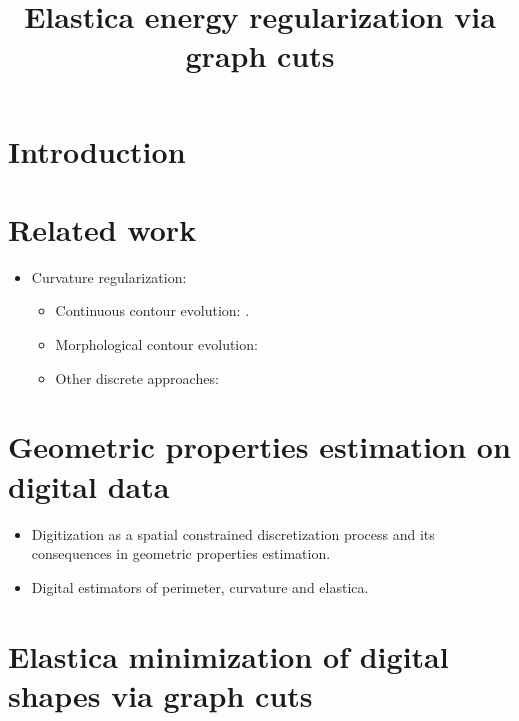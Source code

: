 \documentclass[12pt]{article}
\begin{document}
%
\title{Elastica energy regularization via graph cuts}

\maketitle

\begin{abstract}

\end{abstract}

\section{Introduction}

\section{Related work}
\begin{itemize}
\item{Curvature regularization:
\begin{itemize}
\item{Continuous contour evolution: \cite{kass1988snakes}
\cite{chan01}.}
\item{Morphological contour evolution: \cite{marquezneila14} }
\item{Other discrete approaches: \cite{schoenemann09linear} 
\cite{zehiry10fast}
\cite{nieuwenhuis14efficient} \cite{antunes19} \cite{antunes20}}
\end{itemize}
}
\end{itemize}

\section{Geometric properties estimation on digital data}
\begin{itemize}
\item{Digitization as a spatial constrained discretization process and its consequences in geometric properties estimation.}
\item{Digital estimators of perimeter, curvature and elastica.}
\end{itemize}

\section{Elastica minimization of digital shapes via graph cuts}
\end{document}
